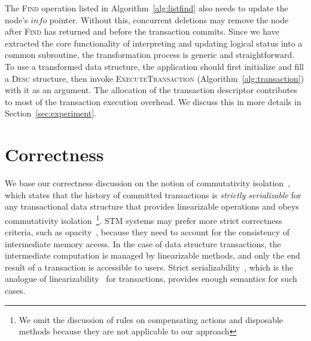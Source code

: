\documentclass{sig-alternate-05-2015}
\begin{document}
The \textsc{Find} operation listed in Algorithm~\ref{alg:listfind} also needs to update the node's $info$ pointer.
Without this, concurrent deletions may remove the node after \textsc{Find} has returned and before the transaction commits.
Since we have extracted the core functionality of interpreting and updating logical status into a common subroutine, the transformation process is generic and straightforward.
To use a transformed data structure, the application should first initialize and fill a \textsc{Desc} structure, then invoke \textsc{ExecuteTransaction} (Algorithm~\ref{alg:transaction}) with it as an argument.
The allocation of the transaction descriptor contributes to most of the transaction execution overhead.
We discuss this in more details in Section~\ref{sec:experiment}.

\section{Correctness}
\label{sec:correctness}
We base our correctness discussion on the notion of commutativity isolation~\cite{herlihy2008transactional}, which states that the history of committed transactions is \emph{strictly serializable} for any transactional data structure that provides linearizable operations and obeys commutativity isolation~\footnote{We omit the discussion of rules on compensating actions and disposable methods because they are not applicable to our approach}.
STM systems may prefer more strict correctness criteria, such as opacity~\cite{guerraoui2008correctness}, because they need to account for the consistency of intermediate memory access.
In the case of data structure transactions, the intermediate computation is managed by linearizable methods, and only the end result of a transaction is accessible to users.
Strict serializability~\cite{papadimitriou1979serializability}, which is the analogue of linearizability~\cite{herlihy1990linearizability} for transactions, provides enough semantics for such cases.
\end{document}
